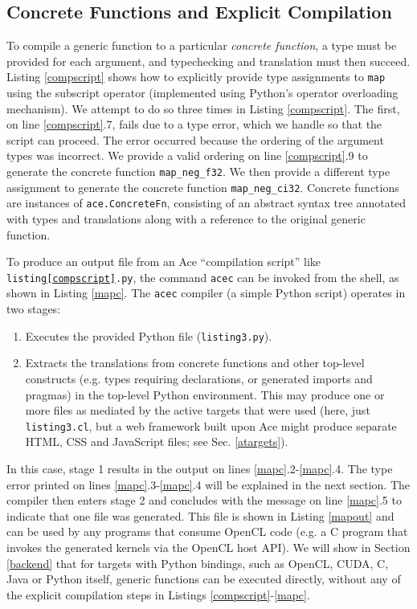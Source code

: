 \documentclass[9pt,preprint]{sigplanconf}
\begin{document}
\subsection{Concrete Functions and Explicit Compilation}
To compile a generic function to a particular \emph{concrete function}, a type must be provided for each argument, and typechecking and translation must then succeed. Listing \ref{compscript} shows how to explicitly provide type assignments to \verb|map| using the subscript operator (implemented using Python's operator overloading mechanism). We attempt to do so three times in Listing \ref{compscript}. The first, on line \ref{compscript}.7, fails due to a type error, which we handle so that the script can proceed. The error occurred  because the ordering of the argument types was incorrect. We provide a valid ordering on line \ref{compscript}.9 to generate the concrete function \verb|map_neg_f32|. We then provide a different type assignment to generate the concrete function \verb|map_neg_ci32|.
Concrete functions are instances of \verb|ace.ConcreteFn|, consisting of an abstract syntax tree annotated with types and translations along with a reference to the original generic function. %

To produce an output file from an Ace ``compilation script'' like \verb|listing|\texttt{\ref{compscript}}\verb|.py|, the command \verb|acec| can be invoked from the shell, as shown in Listing \ref{mapc}. The \verb|acec| compiler (a simple Python script) operates in two stages:
\begin{enumerate}
\item Executes the provided Python file (\verb|listing3.py|).
\item Extracts the translations from concrete functions and other top-level constructs (e.g. types requiring declarations, or generated imports and pragmas) in the top-level Python environment.  This may produce one or more files as mediated by the active targets that were used (here, just \verb|listing3.cl|, but a web framework built upon Ace might produce separate HTML, CSS and JavaScript files; see Sec. \ref{atargets}).
\end{enumerate}

In this case, stage 1 results in the output on lines \ref{mapc}.2-\ref{mapc}.4. The type error printed on lines \ref{mapc}.3-\ref{mapc}.4 will be explained in the next section. The compiler then enters stage 2 and concludes with the message on line \ref{mapc}.5 to indicate that one file was generated. This file is shown in Listing \ref{mapout} and can be used by any programs that consume OpenCL code (e.g. a C program that invokes the generated kernels via the OpenCL host API). 
We will show in Section \ref{backend} that for targets with Python bindings, such as OpenCL, CUDA, C, Java or Python itself, generic functions can be executed directly, without any of the explicit compilation steps in Listings \ref{compscript}-\ref{mapc}.
\end{document}
